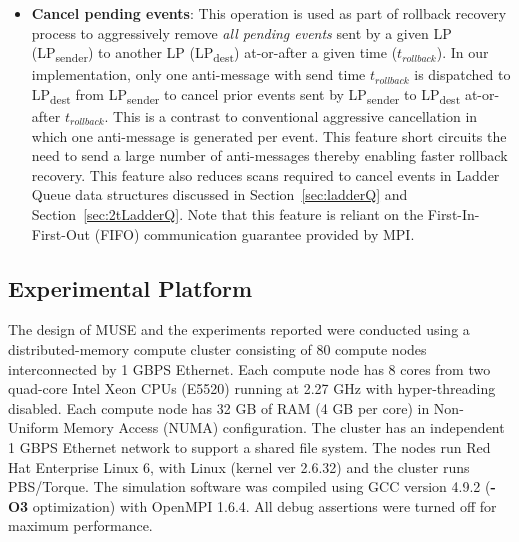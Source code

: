 \begin{itemize}
\item[\ding{185}] \textbf{Cancel pending events}: This operation is used as part of rollback recovery process to aggressively remove \emph{all pending events} sent by a given LP (LP\textsubscript{sender}) to another LP (LP\textsubscript{dest}) at-or-after a given time ($t_{rollback}$). In our implementation, only one anti-message with send time $t_{rollback}$ is dispatched to LP\textsubscript{dest} from LP\textsubscript{sender} to cancel prior events sent by LP\textsubscript{sender} to LP\textsubscript{dest} at-or-after $t_{rollback}$. This is a contrast to conventional aggressive cancellation in which one anti-message is generated per event. This feature short circuits the need to send a large number of anti-messages thereby enabling faster rollback recovery. This feature also reduces scans required to cancel events in Ladder Queue data structures discussed in Section~\ref{sec:ladderQ} and Section~\ref{sec:2tLadderQ}. Note that this feature is reliant on the First-In-First-Out (FIFO) communication guarantee provided by MPI.
\end{itemize}   

\subsection{Experimental Platform}\label{sec:redhawk}
The design of MUSE and the experiments reported were conducted using a distributed-memory compute cluster consisting of 80 compute nodes interconnected by 1 GBPS Ethernet. Each compute node has 8 cores from two quad-core Intel Xeon \textregistered CPUs (E5520) running at 2.27 GHz with hyper-threading disabled. Each compute node has 32 GB of RAM (4 GB per core) in Non-Uniform Memory Access (NUMA) configuration. The cluster has an independent 1 GBPS Ethernet network to support a shared file system. The nodes run Red Hat Enterprise Linux 6, with Linux (kernel ver 2.6.32) and the cluster runs PBS/Torque. The simulation software was compiled using GCC version 4.9.2 (\textbf{-O3} optimization) with OpenMPI 1.6.4. All debug assertions were turned off for maximum performance.

